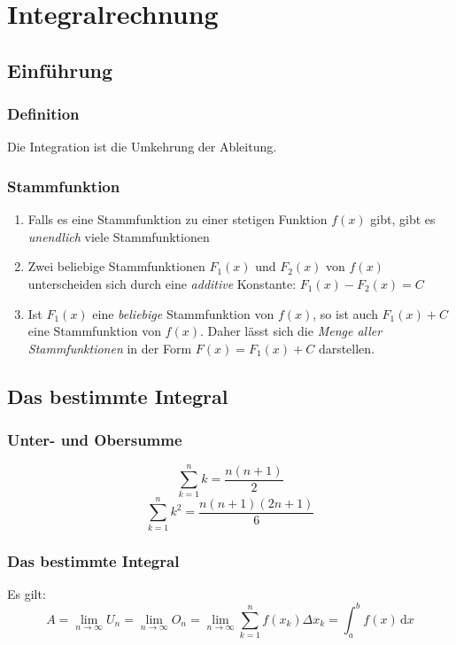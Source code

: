 \documentclass[a4paper,DIV10,12pt,headsepline,smallheadings,halfparskip-]{scrreprt}
\begin{document}
	\chapter{Integralrechnung}
	\section{Einführung} %
	\label{sec:einführung}
	\subsection{Definition} %
	\label{sub:definition}
	Die Integration ist die Umkehrung der Ableitung.
	\subsection{Stammfunktion} %
	\label{sub:stammfunktion}
	\begin{enumerate}
		\item Falls es eine Stammfunktion zu einer stetigen Funktion \(f(x)\) gibt, gibt es \emph{unendlich} viele Stammfunktionen
		\item Zwei beliebige Stammfunktionen \(F_1 (x)\) und \(F_2 (x)\) von \(f(x)\) unterscheiden sich durch eine \emph{additive} Konstante: \(F_1 (x) - F_2 (x) = C\)
		\item Ist \(F_1 (x)\) eine \emph{beliebige} Stammfunktion von \(f (x)\), so ist auch \(F_1 (x) + C\) eine Stammfunktion von \(f (x)\). Daher lässt sich die \emph{Menge aller Stammfunktionen} in der Form \(F(x) = F_1 (x) + C \) darstellen.
	\end{enumerate}
	\section{Das bestimmte Integral} %
	\label{sec:das_bestimmte_integral}
	\subsection{Unter- und Obersumme} %
	\label{sub:unter_und_obersumme}
	\[ \sum_{k=1}^{n} k = \frac{n(n+1)}{2} \]
	\[ \sum_{k=1}^{n} k^2 = \frac{n(n+1)(2n+1)}{6} \]
	\subsection{Das bestimmte Integral} %
	\label{sub:das_bestimmte_integral}
	Es gilt:\newline
	\[A = \lim\limits_{n \rightarrow \infty}U_n = \lim\limits_{n \rightarrow \infty}O_n = \lim\limits_{n \rightarrow \infty}\sum_{k=1}^{n} f(x_k) \Delta x_k = \int_a^b f(x)\,\mathrm{d}x \]
\end{document}
